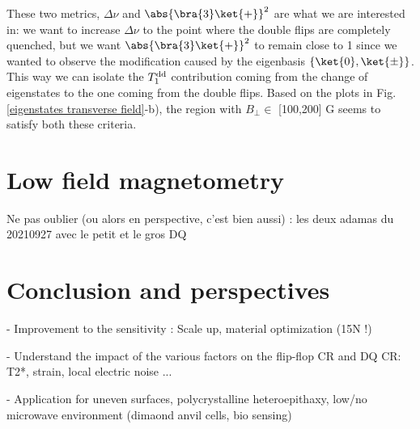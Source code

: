 \documentclass[a4paper,11pt]{report}
\begin{document}
These two metrics, $\Delta \nu$ and $\abs{\bra{3}\ket{+}}^2$ are what we are interested in: we want to increase $\Delta \nu$ to the point where the double flips are completely quenched, but we want $\abs{\bra{3}\ket{+}}^2$ to remain close to 1 since we wanted to observe the modification caused by the eigenbasis $\{\ket{0},\ket{\pm}\}$. This way we can isolate the $T_1^{\rm dd}$ contribution coming from the change of eigenstates to the one coming from the double flips. Based on the plots in Fig.\ref{eigenstates transverse field}-b), the region with $B_\perp \in$ [100,200] G seems to satisfy both these criteria.


\section{Low field magnetometry}

Ne pas oublier (ou alors en perspective, c'est bien aussi) : les deux adamas du 20210927 avec le petit et le gros DQ

\section{Conclusion and perspectives}
- Improvement to the sensitivity : Scale up, material optimization (15N !)

- Understand the impact of the various factors on the flip-flop CR and DQ CR: T2*, strain, local electric noise ...

- Application for uneven surfaces, polycrystalline heteroepithaxy, low/no microwave environment (dimaond anvil cells, bio sensing)

\printbibliography
\end{document}

